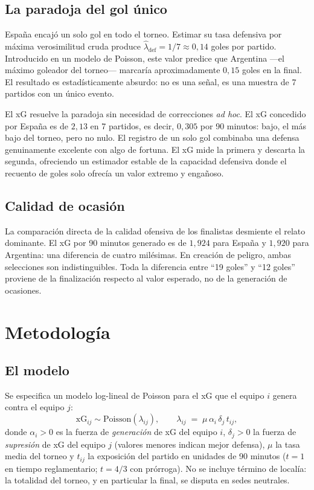 \documentclass[11pt,a4paper]{article}
\newcommand{\xG}{\mathrm{xG}}
\begin{document}
\subsection{La paradoja del gol único}

España encajó un solo gol en todo el torneo. Estimar su tasa defensiva por máxima verosimilitud cruda produce $\hat\lambda_{\text{def}} = 1/7 \approx 0{,}14$ goles por partido. Introducido en un modelo de Poisson, este valor predice que Argentina ---el máximo goleador del torneo--- marcaría aproximadamente $0{,}15$ goles en la final. El resultado es estadísticamente absurdo: no es una señal, es una muestra de 7 partidos con un único evento.

El xG resuelve la paradoja sin necesidad de correcciones \textit{ad hoc}. El xG concedido por España es de $2{,}13$ en 7 partidos, es decir, $0{,}305$ por 90 minutos: bajo, el más bajo del torneo, pero no nulo. El registro de un solo gol combinaba una defensa genuinamente excelente con algo de fortuna. El xG mide la primera y descarta la segunda, ofreciendo un estimador estable de la capacidad defensiva donde el recuento de goles solo ofrecía un valor extremo y engañoso.

\subsection{Calidad de ocasión}

La comparación directa de la calidad ofensiva de los finalistas desmiente el relato dominante. El xG por 90 minutos generado es de $1{,}924$ para España y $1{,}920$ para Argentina: una diferencia de cuatro milésimas. En creación de peligro, ambas selecciones son indistinguibles. Toda la diferencia entre ``19 goles'' y ``12 goles'' proviene de la finalización respecto al valor esperado, no de la generación de ocasiones.

\section{Metodología}
\label{sec:metodo}

\subsection{El modelo}

Se especifica un modelo log-lineal de Poisson \citep{nelderwedderburn1972} para el xG que el equipo $i$ genera contra el equipo $j$:
\begin{equation}
\xG_{ij} \sim \text{Poisson}(\lambda_{ij}), \qquad
\lambda_{ij} \;=\; \mu\, \alpha_i\, \delta_j\, t_{ij},
\label{eq:modelo}
\end{equation}
donde $\alpha_i > 0$ es la fuerza de \emph{generación} de xG del equipo $i$, $\delta_j > 0$ la fuerza de \emph{supresión} de xG del equipo $j$ (valores menores indican mejor defensa), $\mu$ la tasa media del torneo y $t_{ij}$ la exposición del partido en unidades de 90 minutos ($t = 1$ en tiempo reglamentario; $t = 4/3$ con prórroga). No se incluye término de localía: la totalidad del torneo, y en particular la final, se disputa en sedes neutrales.
\end{document}
